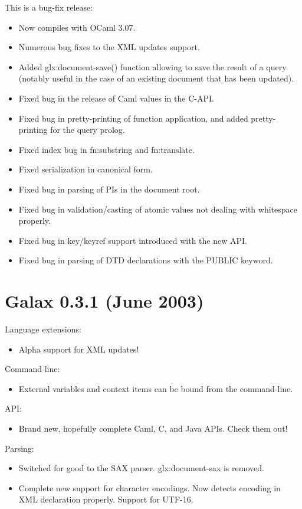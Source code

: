 This is a bug-fix release:
\begin{itemize}
\item Now compiles with OCaml 3.07.
\item Numerous bug fixes to the XML updates support.
\item Added glx:document-save() function allowing to save the result of a
query (notably useful in the case of an existing document that has
been updated).
\item Fixed bug in the release of Caml values in the C-API.
\item Fixed bug in pretty-printing of function application, and added
pretty-printing for the query prolog.
\item Fixed index bug in fn:substring and fn:translate.
\item Fixed serialization in canonical form.
\item Fixed bug in parsing of PIs in the document root.
\item Fixed bug in validation/casting of atomic values not dealing with
whitespace properly.
\item Fixed bug in key/keyref support introduced with the new API.
\item Fixed bug in parsing of DTD declarations with the PUBLIC keyword.
\end{itemize}


\section{Galax 0.3.1 (June 2003)}

Language extensions:
\begin{itemize}
\item Alpha support for XML updates!
\end{itemize}

Command line:
\begin{itemize}
\item External variables and context items can be bound from the
command-line.
\end{itemize}

API:
\begin{itemize}
\item Brand new, hopefully complete Caml, C, and Java APIs.
  Check them out!
\end{itemize}

Parsing:
\begin{itemize}
\item Switched for good to the SAX parser. glx:document-sax is removed.
\item Complete new support for character encodings. Now detects encoding
in XML declaration properly.  Support for UTF-16.
\end{itemize}


